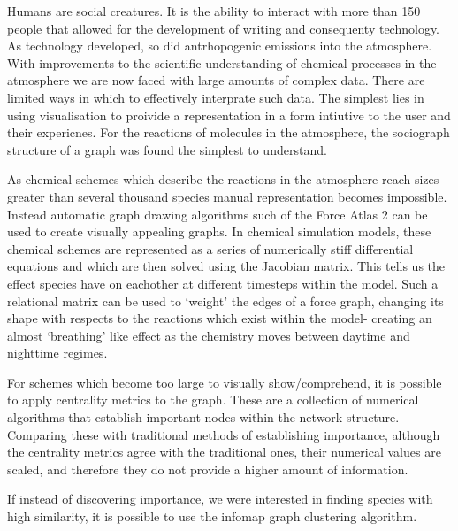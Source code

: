 Humans are social creatures. It is the ability to interact with more than 150 people that allowed for the development of writing and consequenty technology. As technology developed, so did antrhopogenic emissions into the atmosphere. With improvements to the scientific understanding of chemical processes in the atmosphere we are now faced with large amounts of complex data. There are limited ways in which to effectively interprate such data. The simplest lies in using visualisation to proivide a representation in a form intiutive to the user and their expericnes. For the reactions of molecules in the atmosphere, the sociograph structure of a graph was found the simplest to understand.

As chemical schemes which describe the reactions in the atmosphere reach sizes greater than several thousand species manual representation becomes impossible. Instead automatic graph drawing algorithms such of the Force Atlas 2 can be used to create visually appealing graphs. In chemical simulation models, these chemical schemes are represented as a series of numerically stiff differential equations and which are then solved using the Jacobian matrix. This tells us the effect species have on eachother at different timesteps within the model. Such a relational matrix can be used to `weight' the edges of a force graph, changing its shape with respects to the reactions which exist within the model- creating an almost `breathing' like effect as the chemistry moves between daytime and nighttime regimes. 

For schemes which become too large to visually show/comprehend, it is possible to apply centrality metrics to the graph. These are a collection of numerical algorithms that establish important nodes within the network structure. Comparing these with traditional methods of establishing importance, although the centrality metrics agree with the traditional ones, their numerical values are scaled, and therefore they do not provide a higher amount of information.

If instead of discovering importance, we were interested in finding species with high similarity, it is possible to use the infomap graph clustering algorithm.
